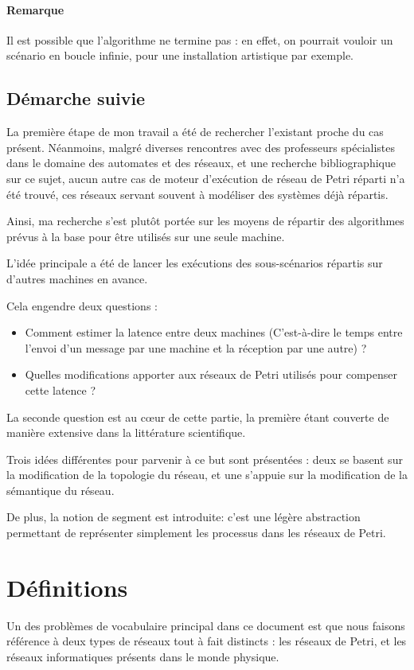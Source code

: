 \paragraph{Remarque} Il est possible que l'algorithme ne termine pas : en effet, on pourrait vouloir un scénario en boucle infinie, pour une installation artistique par exemple.

\subsection{Démarche suivie}
La première étape de mon travail a été de rechercher l'existant proche du cas présent. Néanmoins, malgré diverses rencontres avec des professeurs spécialistes dans le domaine des automates et des réseaux, et une recherche bibliographique sur ce sujet, aucun autre cas de moteur d'exécution de réseau de Petri réparti n'a été trouvé, ces réseaux servant souvent à modéliser des systèmes déjà répartis.

Ainsi, ma recherche s'est plutôt portée sur les moyens de répartir des algorithmes prévus à la base pour être utilisés sur une seule machine. 

L'idée principale a été de lancer les exécutions des sous-scénarios répartis sur d'autres machines en avance.

Cela engendre deux questions : 
\begin{itemize}
\item Comment estimer la latence entre deux machines (C'est-à-dire le temps entre l'envoi d'un message par une machine et la réception par une autre) ? 
\item Quelles modifications apporter aux réseaux de Petri utilisés pour compenser cette latence ?
\end{itemize}

La seconde question est au cœur de cette partie, la première étant couverte de manière extensive dans la littérature scientifique.

Trois idées différentes pour parvenir à ce but sont présentées : deux se basent sur la modification de la topologie du réseau, et une s'appuie sur la modification de la sémantique du réseau.

De plus, la notion de segment est introduite: c'est une légère abstraction permettant de représenter simplement les processus dans les réseaux de Petri.

\section{Définitions}
Un des problèmes de vocabulaire principal dans ce document est que nous faisons référence à deux types de réseaux tout à fait distincts : les réseaux de Petri, et les réseaux informatiques présents dans le monde physique.

